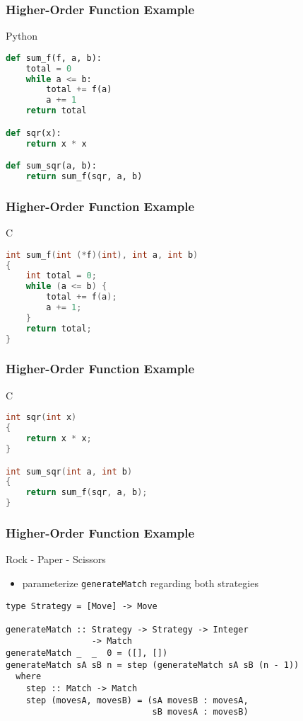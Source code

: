 \documentclass[dvipsnames]{beamer}
\theoremstyle{plain}
\begin{document}
\begin{frame}[fragile]
  \frametitle{Higher-Order Function Example}

  \begin{exampleblock}{Python}
    \begin{lstlisting}[language=Python]
def sum_f(f, a, b):
    total = 0
    while a <= b:
        total += f(a)
        a += 1
    return total

def sqr(x):
    return x * x

def sum_sqr(a, b):
    return sum_f(sqr, a, b)
    \end{lstlisting}
  \end{exampleblock}
\end{frame}

\begin{frame}[fragile]
  \frametitle{Higher-Order Function Example}

  \begin{exampleblock}{C}
    \begin{lstlisting}[language=C]
int sum_f(int (*f)(int), int a, int b)
{
    int total = 0;
    while (a <= b) {
        total += f(a);
        a += 1;
    }
    return total;
}
    \end{lstlisting}
  \end{exampleblock}
\end{frame}

\begin{frame}[fragile]
  \frametitle{Higher-Order Function Example}

  \begin{exampleblock}{C}
    \begin{lstlisting}[language=C]
int sqr(int x)
{
    return x * x;
}

int sum_sqr(int a, int b)
{
    return sum_f(sqr, a, b);
}
    \end{lstlisting}
  \end{exampleblock}
\end{frame}

\begin{frame}[fragile]
  \frametitle{Higher-Order Function Example}

  \begin{exampleblock}{Rock - Paper - Scissors}
    \begin{itemize}
      \item parameterize \lstinline|generateMatch| regarding both strategies
    \end{itemize}

    \begin{lstlisting}
type Strategy = [Move] -> Move

generateMatch :: Strategy -> Strategy -> Integer
                 -> Match
generateMatch _  _  0 = ([], [])
generateMatch sA sB n = step (generateMatch sA sB (n - 1))
  where
    step :: Match -> Match
    step (movesA, movesB) = (sA movesB : movesA,
                             sB movesA : movesB)
    \end{lstlisting}
  \end{exampleblock}
\end{frame}
\end{document}
